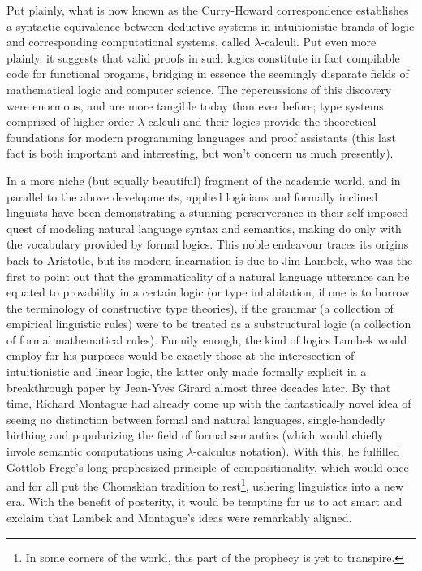 Put plainly, what is now known as the Curry-Howard correspondence establishes a syntactic equivalence between deductive systems in intuitionistic brands of logic and corresponding computational systems, called $\lambda$-calculi.
Put even more plainly, it suggests that valid proofs in such logics constitute in fact compilable code for functional progams, bridging in essence the seemingly disparate fields of mathematical logic and computer science.
The repercussions of this discovery were enormous, and are more tangible today than ever before; type systems comprised of higher-order $\lambda$-calculi and their logics provide the theoretical foundations for modern programming languages and proof assistants (this last fact is both important and interesting, but won't concern us much presently).

In a more niche (but equally beautiful) fragment of the academic world, and in parallel to the above developments, applied logicians and formally inclined linguists have been demonstrating a stunning perserverance in their self-imposed quest of modeling natural language syntax and semantics, making do only with the vocabulary provided by formal logics.
This noble endeavour traces its origins back to Aristotle, but its modern incarnation is due to Jim Lambek, who was the first to point out that the grammaticality of a natural language utterance can be equated to provability in a certain logic (or type inhabitation, if one is to borrow the terminology of constructive type theories), if the grammar (a collection of empirical linguistic rules) were to be treated as a substructural logic (a collection of formal mathematical rules).
Funnily enough, the kind of logics Lambek would employ for his purposes would be exactly those at the interesection of intuitionistic and linear logic, the latter only made formally explicit in a breakthrough paper by Jean-Yves Girard almost three decades later.
By that time, Richard Montague had already come up with the fantastically novel idea of seeing no distinction between formal and natural languages, single-handedly birthing and popularizing the field of formal semantics (which would chiefly invole semantic computations using $\lambda$-calculus notation).
With this, he fulfilled Gottlob Frege's long-prophesized principle of compositionality, which would once and for all put the Chomskian tradition to rest\footnote{In some corners of the world, this part of the prophecy is yet to transpire.}, ushering linguistics into a new era.
With the benefit of posterity, it would be tempting for us to act smart and exclaim that Lambek and Montague's ideas were remarkably aligned. 
